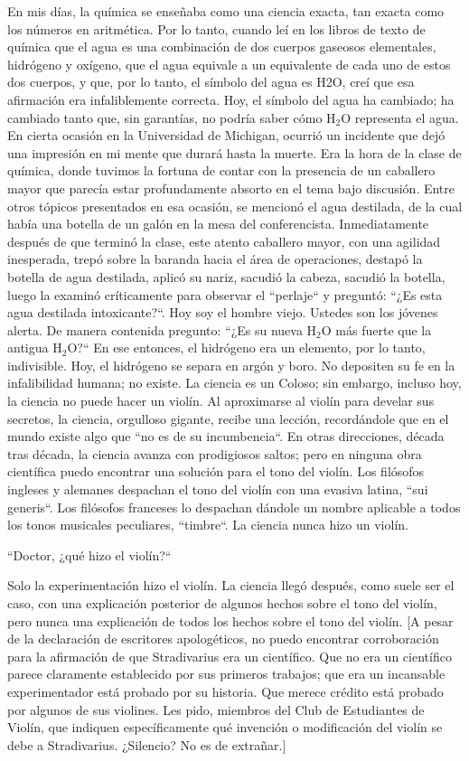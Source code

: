 \documentclass[12pt]{book}
\begin{document}
En mis días, la química se enseñaba como una ciencia exacta, tan exacta como los números en aritmética. Por lo tanto, cuando leí en los libros de texto de química que el agua es una combinación de dos cuerpos gaseosos elementales, hidrógeno y oxígeno, que el agua equivale a un equivalente de cada uno de estos dos cuerpos, y que, por lo tanto, el símbolo del agua es H2O, creí que esa afirmación era infaliblemente correcta. Hoy, el símbolo del agua ha cambiado; ha cambiado tanto que, sin garantías, no podría saber cómo \( \text{H}_2 \text{O} \) representa el agua.
En cierta ocasión en la Universidad de Michigan, ocurrió un incidente que dejó una impresión en mi mente que durará hasta la muerte. Era la hora de la clase de química, donde tuvimos la fortuna de contar con la presencia de un caballero mayor que parecía estar profundamente absorto en el tema bajo discusión. Entre otros tópicos presentados en esa ocasión, se mencionó el agua destilada, de la cual había una botella de un galón en la mesa del conferencista. Inmediatamente después de que terminó la clase, este atento caballero mayor, con una agilidad inesperada, trepó sobre la baranda hacia el área de operaciones, destapó la botella de agua destilada, aplicó su nariz, sacudió la cabeza, sacudió la botella, luego la examinó críticamente para observar el ``perlaje`` y preguntó: ``¿Es esta agua destilada intoxicante?``. Hoy soy el hombre viejo. Ustedes son los jóvenes alerta.
De manera contenida pregunto: ``¿Es su nueva \( \text{H}_2\text{O} \) más fuerte que la antigua \( \text{H}_2 \text{O} \)?``
En ese entonces, el hidrógeno era un elemento, por lo tanto, indivisible. Hoy, el hidrógeno se separa en argón y boro. No depositen su fe en la infalibilidad humana; no existe. La ciencia es un Coloso; sin embargo, incluso hoy, la ciencia no puede hacer un violín. Al aproximarse al violín para develar sus secretos, la ciencia, orgulloso gigante, recibe una lección, recordándole que en el mundo existe algo que ``no es de su incumbencia``.
En otras direcciones, década tras década, la ciencia avanza con prodigiosos saltos; pero en ninguna obra científica puedo encontrar una solución para el tono del violín.
Los filósofos ingleses y alemanes despachan el tono del violín con una evasiva latina, ``sui generis``. Los filósofos franceses lo despachan dándole un nombre aplicable a todos los tonos musicales peculiares, ``timbre``.
La ciencia nunca hizo un violín.

``Doctor, ¿qué hizo el violín?``

Solo la experimentación hizo el violín. La ciencia llegó después, como suele ser el caso, con una explicación posterior de algunos hechos sobre el tono del violín, pero nunca una explicación de todos los hechos sobre el tono del violín.
[A pesar de la declaración de escritores apologéticos, no puedo encontrar corroboración para la afirmación de que Stradivarius era un científico. Que no era un científico parece claramente establecido por sus primeros trabajos; que era un incansable experimentador está probado por su historia. Que merece crédito está probado por algunos de sus violines. Les pido, miembros del Club de Estudiantes de Violín, que indiquen específicamente qué invención o modificación del violín se debe a Stradivarius.
¿Silencio?
No es de extrañar.]
\end{document}
